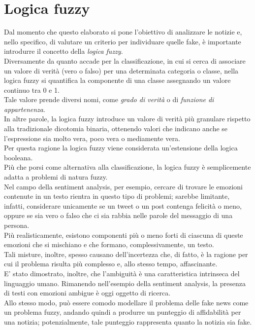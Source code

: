 \documentclass[12pt]{report}
\theoremstyle{definition}
\begin{document}
\section{Logica fuzzy} \label{insiemifuzzy}
Dal momento che questo elaborato si pone l'obiettivo di analizzare le notizie e, nello specifico, di valutare un criterio per individuare quelle fake, è importante introdurre il concetto della \textit{logica fuzzy}.
\\
Diversamente da quanto accade per la classificazione, in cui si cerca di associare un valore di verità (vero o falso) per una determinata categoria o classe, nella logica fuzzy si quantifica la componente di una classe assegnando un valore continuo tra 0 e 1.
\\
Tale valore prende diversi nomi, come \textit{grado di verità} o di \textit{funzione di appartenenza}.
\\
In altre parole, la logica fuzzy introduce un valore di verità più granulare rispetto alla tradizionale dicotomia binaria, ottenendo valori che indicano anche se l'espressione sia molto vera, poco vera o mediamente vera.
\\
Per questa ragione la logica fuzzy viene considerata un'estensione della logica booleana.
\\
Più che porsi come alternativa alla classificazione, la logica fuzzy è semplicemente adatta a problemi di natura fuzzy.
\\
Nel campo della sentiment analysis, per esempio, cercare di trovare le emozioni contenute in un testo rientra in questo tipo di problemi; sarebbe limitante, infatti, considerare unicamente se un tweet o un post contenga felicità o meno, oppure se sia vero o falso che ci sia rabbia nelle parole del messaggio di una persona.
\\
Più realisticamente, esistono componenti più o meno forti di ciascuna di queste emozioni che si mischiano e che formano, complessivamente, un testo.
\\
Tali misture, inoltre, spesso causano dell'incertezza che, di fatto, è la ragione per cui il problema risulta più complesso e, allo stesso tempo, affascinante.
\\
E' stato dimostrato, inoltre, che l'ambiguità è una caratteristica intrinseca del linguaggio umano.
Rimanendo nell'esempio della sentiment analysis, la presenza di testi con emozioni ambigue è oggi oggetto di ricerca.
\\
Allo stesso modo, può essere comodo modellare il problema delle fake news come un problema fuzzy, andando quindi a produrre un punteggio di affidabilità per una notizia;
potenzialmente, tale punteggio rappresenta quanto la notizia sia fake.
\end{document}
